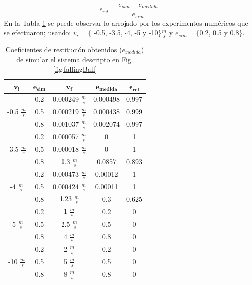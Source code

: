 \documentclass{article}
\begin{document}
 \begin{equation}
  \epsilon_{rel} = \frac{e_{sim}-e_{medida}}{e_{sim}}
\end{equation}
En la Tabla \ref{table1} se puede observar lo arrojado por los experimentos num\'ericos que se efectuaron; usando: $v_{i}= \{$ -0.5, -3.5, -4, -5 y -10$\} \frac{m}{s}$ y $e_{sim}= \{ $0.2, 0.5 y 0.8$\} $.
\begin{table}[H]%
  \centering
  	\begin{tabular}{ | c | c || c | c | c | }
	  		\hline
	  		$\boldsymbol{v_{i}}$ & $\boldsymbol{e_{sim}}$ & $\boldsymbol{v_{f}}$ & $\boldsymbol{e_{medida}}$ & $\boldsymbol{\epsilon_{rel}}$ \\
			\hline 
			\multirow{3}{*}{-0.5 $\frac{m}{s}$} & 0.2 & 0.000249 $\frac{m}{s}$& 0.000498 & 0.997\\ \cline{2-5}
								& 0.5 & 0.000219 $\frac{m}{s}$ & 0.000438 & 0.999\\ \cline{2-5}
	  							& 0.8 & 0.001037 $\frac{m}{s}$ & 0.002074 & 0.997 \\ \cline{2-5}
	  		\hline 
			\hline
			\multirow{3}{*}{-3.5 $\frac{m}{s}$} & 0.2 & 0.000057 $\frac{m}{s}$ & 0 & 1\\ \cline{2-5}
	  							& 0.5 & 0.000018 $\frac{m}{s}$ & 0 & 1 \\ \cline{2-5}
								& 0.8 & 0.3 $\frac{m}{s}$ & 0.0857 & 0.893 \\ \cline{2-5}
	  		\hline
			\hline
			\multirow{3}{*}{-4 $\frac{m}{s}$} & 0.2 & 0.000473 $\frac{m}{s}$ & 0.00012 & 1\\ \cline{2-5}
	  							& 0.5 & 0.000424 $\frac{m}{s}$ & 0.00011 & 1 \\ \cline{2-5}
	  							& 0.8 & 1.23 $\frac{m}{s}$ & 0.3 & 0.625 \\ \cline{2-5}
	  		\hline
			\hline
			\multirow{3}{*}{-5 $\frac{m}{s}$} & 0.2 & 1 $\frac{m}{s}$ & 0.2 & 0 \\ \cline{2-5}
	  							& 0.5 & 2.5 $\frac{m}{s}$ & 0.5 & 0 \\ \cline{2-5}
	  							& 0.8 & 4 $\frac{m}{s}$ & 0.8 & 0 \\ \cline{2-5}
			\hline
			\hline
			\multirow{3}{*}{-10 $\frac{m}{s}$} & 0.2 & 2 $\frac{m}{s}$ & 0.2 & 0\\ \cline{2-5}
	  							& 0.5 & 5 $\frac{m}{s}$ & 0.5 & 0 \\ \cline{2-5}
	  							& 0.8 & 8 $\frac{m}{s}$ & 0.8 & 0 \\ \cline{2-5}
			\hline
	\end{tabular}
  \captionsetup{justification=centering}
  \caption{Coeficientes de restituci\'on obtenidos ($e_{medida}$) de simular el sistema descripto en Fig. \ref{fig:fallingBall}}%
  \label{table1}%
\end{table}
\end{document}
